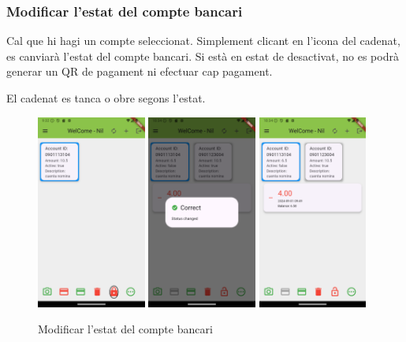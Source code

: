 \documentclass[a4paper,12pt,twoside]{ThesisStyle}
\begin{document}
\clearpage

\subsubsection{Modificar l'estat del compte bancari}
\label{subsubsec:Modificar l'estat del compte bancari}

Cal que hi hagi un compte seleccionat. Simplement clicant en l'icona del cadenat, es canviarà l'estat del compte bancari. Si està en estat de desactivat, no es podrà generar un QR de pagament ni efectuar cap pagament.

El cadenat es tanca o obre segons l'estat.

\begin{figure}[h]
    \centering
    \includegraphics[width=0.32\textwidth]{imatges/mainpageAccount5.png}
    \includegraphics[width=0.32\textwidth]{imatges/changeStatus1.png}
    \includegraphics[width=0.32\textwidth]{imatges/changeStatus2.png}
    \caption{Modificar l'estat del compte bancari}
    \label{fig: Modificar l'estat del compte bancari}
\end{figure}
\end{document}
